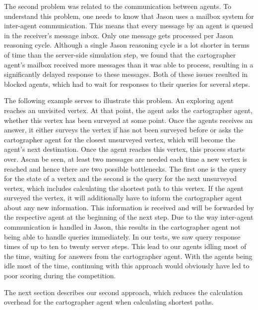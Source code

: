 The second problem was related to the communication between agents.
To understand this problem, one needs to know that Jason uses a mailbox system for inter-agent communication.
This means that every message by an agent is queued in the receiver's message inbox.
Only one message gets processed per Jason reasoning cycle.
Although a single Jason reasoning cycle is a lot shorter in terms of time than the server-side simulation step, we found that the cartographer agent's mailbox received more messages than it was able to process, resulting in a significantly delayed response to these messages.
Both of these issues resulted in blocked agents, which had to wait for responses to their queries for several steps.

The following example serves to illustrate this problem.
An exploring agent reaches an unvisited vertex.
At that point, the agent asks the cartographer agent, whether this vertex has been surveyed at some point.
Once the agents receives an answer, it either surveys the vertex if has not been surveyed before or asks the cartographer agent for the closest unsurveyed vertex, which will become the agent's next destination.
Once the agent reaches this vertex, this process starts over.
Ascan be seen, at least two messages are needed each time a new vertex is reached and hence there are two possible bottlenecks.
The first one is the query for the state of a vertex and the second is the query for the next unsurveyed vertex, which includes calculating the shortest path to this vertex.
If the agent surveyed the vertex, it will additionally have to inform the cartographer agent about any new information.
This information is received and will be forwarded by the respective agent at the beginning of the next step.
Due to the way inter-agent communication is handled in Jason, this results in the cartographer agent not being able to handle queries immediately.
In our tests, we saw query response times of up to ten to twenty server steps.
This lead to our agents idling most of the time, waiting for answers from the cartographer agent.
With the agents being idle most of the time, continuing with this approach would obviously have led to poor scoring during the competition.

The next section describes our second approach, which reduces the calculation overhead for the cartographer agent when calculating shortest paths.

